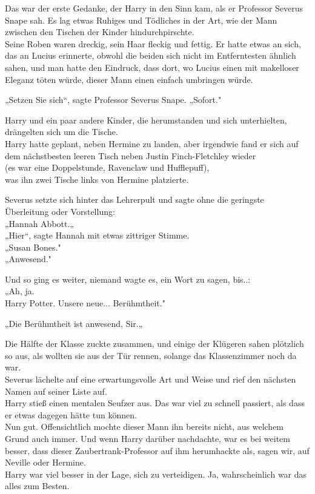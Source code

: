 {Das war der erste Gedanke, der Harry in den Sinn kam, als er Professor Severus Snape sah. Es lag etwas Ruhiges und Tödliches in der Art, wie der Mann zwischen den Tischen der Kinder hindurchpirschte.\\ Seine Roben waren dreckig, sein Haar fleckig und fettig. Er hatte etwas an sich, das an Lucius erinnerte, obwohl die beiden sich nicht im Entferntesten ähnlich sahen, und man hatte den Eindruck, dass dort, wo Lucius einen mit makelloser Eleganz töten würde, dieser Mann einen einfach umbringen würde.

„Setzen Sie sich“, sagte Professor Severus Snape. „Sofort."

Harry und ein paar andere Kinder, die herumstanden und sich unterhielten, drängelten sich um die Tische.\\ Harry hatte geplant, neben Hermine zu landen, aber irgendwie fand er sich auf dem nächstbesten leeren Tisch neben Justin Finch-Fletchley wieder\\ (es war eine Doppelstunde, Ravenclaw und Hufflepuff),\\ was ihn zwei Tische links von Hermine platzierte.

Severus setzte sich hinter das Lehrerpult und sagte ohne die geringste Überleitung oder Vorstellung:\\ „Hannah Abbott.„\\ „Hier“, sagte Hannah mit etwas zittriger Stimme.\\ „Susan Bones."\\ „Anwesend."

Und so ging es weiter, niemand wagte es, ein Wort zu sagen, bis..:\\ „Ah, ja.\\ Harry Potter. Unsere neue... Berühmtheit."

„Die Berühmtheit ist anwesend, Sir.„

Die Hälfte der Klasse zuckte zusammen, und einige der Klügeren sahen plötzlich so aus, als wollten sie aus der Tür rennen, solange das Klassenzimmer noch da war.\\ Severus lächelte auf eine erwartungsvolle Art und Weise und rief den nächsten Namen auf seiner Liste auf.\\ Harry stieß einen mentalen Seufzer aus. Das war viel zu schnell passiert, als dass er etwas dagegen hätte tun können.\\ Nun gut. Offensichtlich mochte dieser Mann ihn bereits nicht, aus welchem Grund auch immer. Und wenn Harry darüber nachdachte, war es bei weitem besser, dass dieser Zaubertrank-Professor auf ihm herumhackte als, sagen wir, auf Neville oder Hermine.\\ Harry war viel besser in der Lage, sich zu verteidigen. Ja, wahrscheinlich war das alles zum Besten.

}
